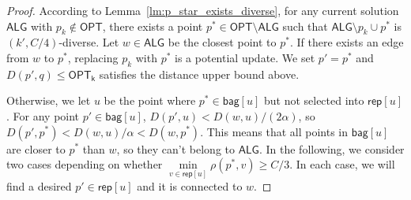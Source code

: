 \begin{proof}
According to Lemma~\ref{lm:p_star_exists_diverse}, for any current solution $\mathsf{ALG}$ with $p_k\notin \mathsf{OPT}$, there exists a point $p^*\in \mathsf{OPT}\setminus \mathsf{ALG}$ such that $\mathsf{ALG}\setminus p_k\cup p^*$ is $(k',C/4)$-diverse. Let $w\in \mathsf{ALG}$ be the closest point to $p^*$. If there exists an edge from $w$ to $p^*$, replacing $p_k$ with $p^*$ is a potential update. We set $p'=p^*$ and $D(p',q)\le \mathsf{OPT_k}$ satisfies the distance upper bound above.



Otherwise, we let $u$ be the point where $p^*\in \mathsf{bag}[u]$ but not selected into $\mathsf{rep}[u]$. For any point $p'\in \mathsf{bag}[u]$, $D(p',u)<D(w,u)/(2\alpha)$, so $D(p',p^*)<D(w,u)/\alpha<D(w,p^*)$. This means that all points in $\mathsf{bag}[u]$ are closer to $p^*$ than $w$, so they can't belong to $\mathsf{ALG}$. In the following, we consider two cases depending on whether $\min\limits_{v\in \mathsf{rep}[u]}\rho(p^*,v)\ge C/3$. In each case, we will find a desired $p'\in \mathsf{rep}[u]$ and it is connected to $w$.


\end{proof}
